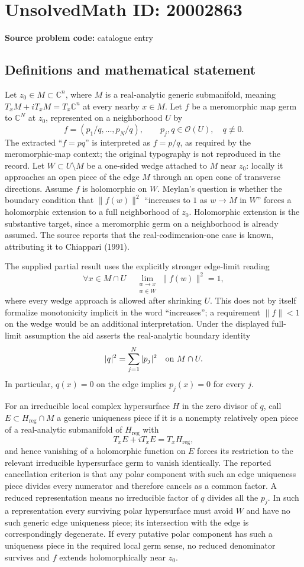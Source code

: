 \documentclass[11pt]{article}
\newcommand{\C}{\mathbb{C}}
\begin{document}
\section*{UnsolvedMath ID: 20002863}
\textbf{Source problem code:} catalogue entry
\subsection{Definitions and mathematical statement}
Let $z_0\in M\subset\C^n$, where $M$ is a real-analytic generic submanifold, meaning $T_xM+iT_xM=T_x\C^n$ at every nearby $x\in M$. Let $f$ be a meromorphic map germ to $\C^N$ at $z_0$, represented on a neighborhood $U$ by
\[
f=(p_1/q,\ldots,p_N/q),\qquad p_j,q\in\mathcal O(U),\quad q\not\equiv0.
\]
The extracted ``$f=pq$'' is interpreted as $f=p/q$, as required by the meromorphic-map context; the original typography is not reproduced in the record. Let $W\subset U\setminus M$ be a one-sided wedge attached to $M$ near $z_0$: locally it approaches an open piece of the edge $M$ through an open cone of transverse directions. Assume $f$ is holomorphic on $W$. Meylan's question is whether the boundary condition that $\|f(w)\|^2$ ``increases to $1$ as $w\to M$ in $W$'' forces a holomorphic extension to a full neighborhood of $z_0$. Holomorphic extension is the substantive target, since a meromorphic germ on a neighborhood is already assumed. The source reports that the real-codimension-one case is known, attributing it to Chiappari (1991).

The supplied partial result uses the explicitly stronger edge-limit reading
\[
\forall x\in M\cap U\quad \lim_{\substack{w\to x\\w\in W}}\|f(w)\|^2=1,
\]
where every wedge approach is allowed after shrinking $U$. This does not by itself formalize monotonicity implicit in the word ``increases''; a requirement $\|f\|<1$ on the wedge would be an additional interpretation. Under the displayed full-limit assumption the aid asserts the real-analytic boundary identity
\[
|q|^2=\sum_{j=1}^N|p_j|^2\quad\hbox{on }M\cap U.
\]
In particular, $q(x)=0$ on the edge implies $p_j(x)=0$ for every $j$.

For an irreducible local complex hypersurface $H$ in the zero divisor of $q$, call $E\subset H_{\mathrm{reg}}\cap M$ a generic uniqueness piece if it is a nonempty relatively open piece of a real-analytic submanifold of $H_{\mathrm{reg}}$ with
\[
T_xE+iT_xE=T_xH_{\mathrm{reg}},
\]
and hence vanishing of a holomorphic function on $E$ forces its restriction to the relevant irreducible hypersurface germ to vanish identically. The reported cancellation criterion is that any polar component with such an edge uniqueness piece divides every numerator and therefore cancels as a common factor. A reduced representation means no irreducible factor of $q$ divides all the $p_j$. In such a representation every surviving polar hypersurface must avoid $W$ and have no such generic edge uniqueness piece; its intersection with the edge is correspondingly degenerate. If every putative polar component has such a uniqueness piece in the required local germ sense, no reduced denominator survives and $f$ extends holomorphically near $z_0$.
\end{document}
